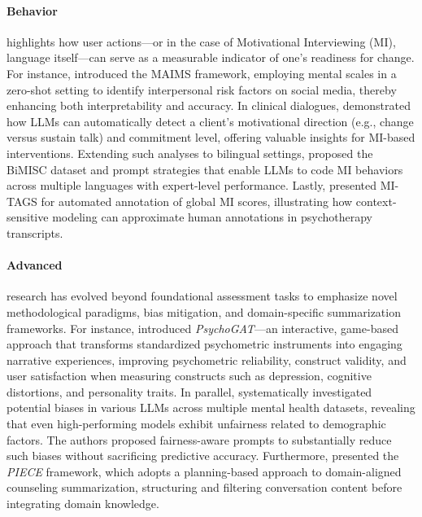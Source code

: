 \paragraph{Behavior} highlights how user actions—or in the case of Motivational Interviewing (MI), language itself—can serve as a measurable indicator of one’s readiness for change. For instance, \citet{36} introduced the MAIMS framework, employing mental scales in a zero-shot setting to identify interpersonal risk factors on social media, thereby enhancing both interpretability and accuracy. In clinical dialogues, \citet{60} demonstrated how LLMs can automatically detect a client’s motivational direction (e.g., change versus sustain talk) and commitment level, offering valuable insights for MI-based interventions. Extending such analyses to bilingual settings, \citet{65} proposed the BiMISC dataset and prompt strategies that enable LLMs to code MI behaviors across multiple languages with expert-level performance. Lastly, \citet{67} presented MI-TAGS for automated annotation of global MI scores, illustrating how context-sensitive modeling can approximate human annotations in psychotherapy transcripts.


\paragraph{Advanced} research has evolved beyond foundational assessment tasks to emphasize novel methodological paradigms, bias mitigation, and domain-specific summarization frameworks. For instance, \citet{48} introduced \emph{PsychoGAT}—an interactive, game-based approach that transforms standardized psychometric instruments into engaging narrative experiences, improving psychometric reliability, construct validity, and user satisfaction when measuring constructs such as depression, cognitive distortions, and personality traits. In parallel, \citet{53} systematically investigated potential biases in various LLMs across multiple mental health datasets, revealing that even high-performing models exhibit unfairness related to demographic factors. The authors proposed fairness-aware prompts to substantially reduce such biases without sacrificing predictive accuracy. Furthermore, \citet{99} presented the \emph{PIECE} framework, which adopts a planning-based approach to domain-aligned counseling summarization, structuring and filtering conversation content before integrating domain knowledge.


